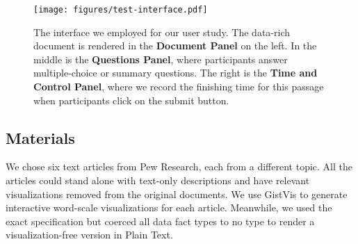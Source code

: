 \begin{figure*}[tb]
  \centering
  \texttt{[image: figures/test-interface.pdf]}
  \caption{The interface we employed for our user study. The data-rich document is rendered in the \textbf{Document Panel} on the left. In the middle is the \textbf{Questions Panel}, where participants answer multiple-choice or summary questions. The right is the \textbf{Time and Control Panel}, where we record the finishing time for this passage when participants click on the submit button.}
  \label{fig:User-Study-Interface}
\end{figure*}

\subsection{Materials}
We chose six text articles from Pew Research, each from a different topic. All the articles could stand alone with text-only descriptions and have relevant visualizations removed from the original documents. We use GistVis to generate interactive word-scale visualizations for each article. Meanwhile, we used the exact specification but coerced all data fact types to no type to render a visualization-free version in Plain Text.

